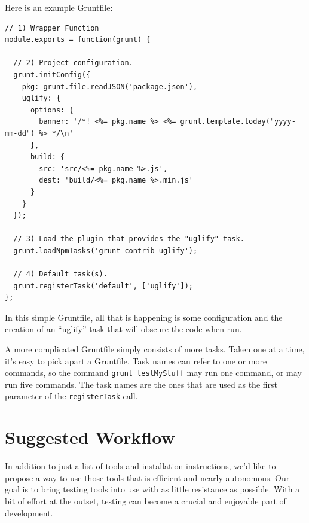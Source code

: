 \documentclass[12pt]{ucthesis}
\begin{document}
Here is an example Gruntfile:
\begin{lstlisting}
// 1) Wrapper Function
module.exports = function(grunt) {

  // 2) Project configuration.
  grunt.initConfig({
    pkg: grunt.file.readJSON('package.json'),
    uglify: {
      options: {
        banner: '/*! <%= pkg.name %> <%= grunt.template.today("yyyy-mm-dd") %> */\n'
      },
      build: {
        src: 'src/<%= pkg.name %>.js',
        dest: 'build/<%= pkg.name %>.min.js'
      }
    }
  });

  // 3) Load the plugin that provides the "uglify" task.
  grunt.loadNpmTasks('grunt-contrib-uglify');

  // 4) Default task(s).
  grunt.registerTask('default', ['uglify']);
};
\end{lstlisting}

In this simple Gruntfile, all that is happening is some configuration and the creation of an ``uglify'' task that will obscure the code when run.

A more complicated Gruntfile simply consists of more tasks. Taken one at a time, it's easy to pick apart a Gruntfile. Task names can refer to one or more commands, so the command \lstinline{grunt testMyStuff} may run one command, or may run five commands. The task names are the ones that are used as the first parameter of the \lstinline{registerTask} call.

\section{Suggested Workflow}
In addition to just a list of tools and installation instructions, we'd like to propose a way to use those tools that is efficient and nearly autonomous. Our goal is to bring testing tools into use with as little resistance as possible. With a bit of effort at the outset, testing can become a crucial and enjoyable part of development.
\end{document}

